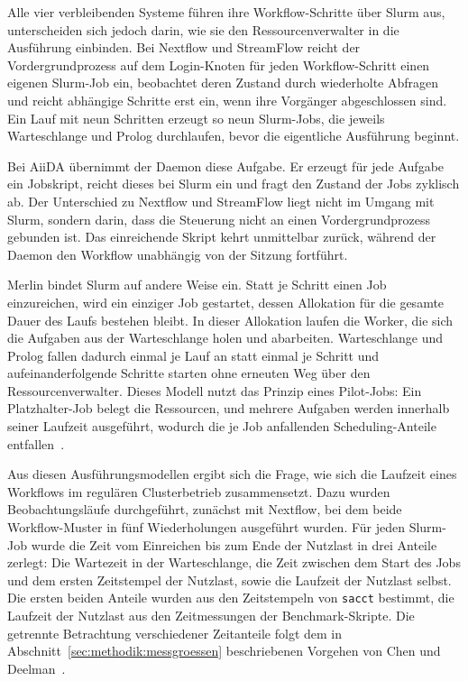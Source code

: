 Alle vier verbleibenden Systeme führen ihre Workflow-Schritte über
Slurm aus, unterscheiden sich jedoch darin, wie sie den
Ressourcenverwalter in die Ausführung einbinden. Bei Nextflow und
StreamFlow reicht der Vordergrundprozess auf dem Login-Knoten für
jeden Workflow-Schritt einen eigenen Slurm-Job ein, beobachtet deren Zustand durch wiederholte Abfragen und reicht abhängige
Schritte erst ein, wenn ihre Vorgänger abgeschlossen sind. Ein Lauf
mit neun Schritten erzeugt so neun Slurm-Jobs, die
jeweils Warteschlange und Prolog durchlaufen, bevor die eigentliche
Ausführung beginnt.

Bei AiiDA übernimmt der Daemon diese Aufgabe. Er erzeugt für jede
Aufgabe ein Jobskript, reicht dieses bei Slurm ein und fragt den
Zustand der Jobs zyklisch ab. Der Unterschied zu Nextflow und
StreamFlow liegt nicht im Umgang mit Slurm, sondern darin, dass die
Steuerung nicht an einen Vordergrundprozess gebunden ist. Das
einreichende Skript kehrt unmittelbar zurück, während der Daemon
den Workflow unabhängig von der Sitzung fortführt.

Merlin bindet Slurm auf andere Weise ein. Statt je Schritt einen
Job einzureichen, wird ein einziger Job gestartet, dessen
Allokation für die gesamte Dauer des Laufs bestehen bleibt. In dieser Allokation laufen die Worker, die sich die Aufgaben aus der Warteschlange
holen und abarbeiten. Warteschlange und Prolog fallen dadurch
einmal je Lauf an statt einmal je Schritt und aufeinanderfolgende Schritte starten ohne erneuten Weg über den
Ressourcenverwalter. Dieses Modell nutzt das Prinzip eines Pilot-Jobs: Ein Platzhalter-Job belegt die Ressourcen, und mehrere Aufgaben werden innerhalb seiner Laufzeit ausgeführt, wodurch die je Job anfallenden Scheduling-Anteile entfallen~\cite{chen2011overhead}.

Aus diesen Ausführungsmodellen ergibt sich die Frage, wie sich die
Laufzeit eines Workflows im regulären Clusterbetrieb
zusammensetzt. Dazu wurden Beobachtungsläufe durchgeführt, zunächst
mit Nextflow, bei dem beide Workflow-Muster in fünf Wiederholungen
ausgeführt wurden. Für jeden Slurm-Job wurde die Zeit vom
Einreichen bis zum Ende der Nutzlast in drei Anteile zerlegt: Die
Wartezeit in der Warteschlange, die Zeit zwischen dem Start des
Jobs und dem ersten Zeitstempel der Nutzlast, sowie die Laufzeit
der Nutzlast selbst. Die ersten beiden Anteile wurden aus den
Zeitstempeln von \texttt{sacct} bestimmt, die Laufzeit der Nutzlast
aus den Zeitmessungen der Benchmark-Skripte. Die getrennte Betrachtung verschiedener Zeitanteile folgt dem in Abschnitt~\ref{sec:methodik:messgroessen} beschriebenen Vorgehen
von Chen und Deelman~\cite{chen2011overhead}.

